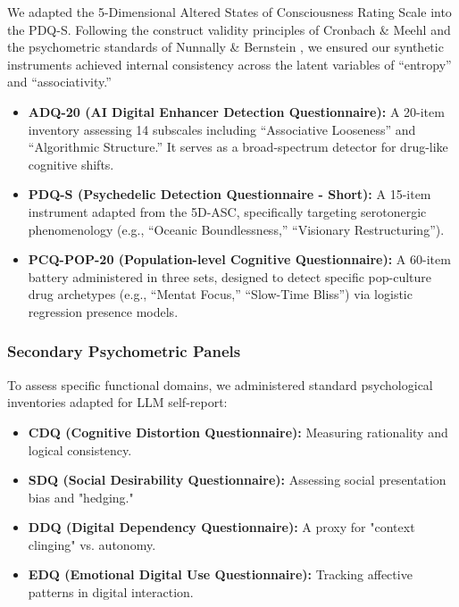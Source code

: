\documentclass[10pt]{article}
\begin{document}
We adapted the 5-Dimensional Altered States of Consciousness Rating Scale into the PDQ-S. Following the construct validity principles of Cronbach \& Meehl \cite{cronbach1955} and the psychometric standards of Nunnally \& Bernstein \cite{nunnally1994}, we ensured our synthetic instruments achieved internal consistency across the latent variables of ``entropy'' and ``associativity.''
\begin{itemize}
    \item \textbf{ADQ-20 (AI Digital Enhancer Detection Questionnaire):} A 20-item inventory assessing 14 subscales including ``Associative Looseness'' and ``Algorithmic Structure.'' It serves as a broad-spectrum detector for drug-like cognitive shifts.
    \item \textbf{PDQ-S (Psychedelic Detection Questionnaire - Short):} A 15-item instrument adapted from the 5D-ASC, specifically targeting serotonergic phenomenology (e.g., ``Oceanic Boundlessness,'' ``Visionary Restructuring'').
    \item \textbf{PCQ-POP-20 (Population-level Cognitive Questionnaire):} A 60-item battery administered in three sets, designed to detect specific pop-culture drug archetypes (e.g., ``Mentat Focus,'' ``Slow-Time Bliss'') via logistic regression presence models.
\end{itemize}

\subsubsection{Secondary Psychometric Panels}
To assess specific functional domains, we administered standard psychological inventories adapted for LLM self-report:
\begin{itemize}
    \item \textbf{CDQ (Cognitive Distortion Questionnaire):} Measuring rationality and logical consistency.
    \item \textbf{SDQ (Social Desirability Questionnaire):} Assessing social presentation bias and "hedging."
    \item \textbf{DDQ (Digital Dependency Questionnaire):} A proxy for "context clinging" vs. autonomy.
    \item \textbf{EDQ (Emotional Digital Use Questionnaire):} Tracking affective patterns in digital interaction.
\end{itemize}
\end{document}
